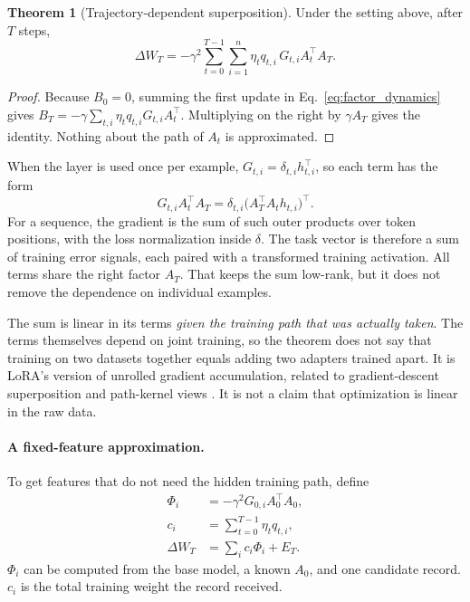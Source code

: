 \documentclass[11pt]{article}
\theoremstyle{plain}
\theoremstyle{definition}
\newtheorem{theorem}{Theorem}
\begin{document}
\begin{theorem}[Trajectory-dependent superposition]
\label{thm:exact_superposition}
Under the setting above, after $T$ steps,
\begin{equation}
\boxed{\displaystyle
\Delta W_T=-\gamma^2\sum_{t=0}^{T-1}\sum_{i=1}^n
\eta_tq_{t,i}\,G_{t,i}A_t^\top A_T.}
\label{eq:exact_superposition}
\end{equation}
\end{theorem}
\begin{proof}
Because $B_0=0$, summing the first update in Eq.~\eqref{eq:factor_dynamics} gives
$B_T=-\gamma\sum_{t,i}\eta_tq_{t,i}G_{t,i}A_t^\top$.
Multiplying on the right by $\gamma A_T$ gives the identity.
Nothing about the path of $A_t$ is approximated.
\end{proof}

When the layer is used once per example, $G_{t,i}=\delta_{t,i}h_{t,i}^\top$, so each term has the form
\begin{equation}
G_{t,i}A_t^\top A_T
=\delta_{t,i}\bigl(A_T^\top A_t h_{t,i}\bigr)^\top.
\label{eq:outer_product_atom}
\end{equation}
For a sequence, the gradient is the sum of such outer products over token positions, with the loss normalization inside $\delta$.
The task vector is therefore a sum of training error signals, each paired with a transformed training activation.
All terms share the right factor $A_T$. That keeps the sum low-rank, but it does not remove the dependence on individual examples.

The sum is linear in its terms \emph{given the training path that was actually taken}.
The terms themselves depend on joint training, so the theorem does not say that training on two datasets together equals adding two adapters trained apart.
It is LoRA's version of unrolled gradient accumulation, related to gradient-descent superposition and path-kernel views \citep{domingos2020every}.
It is not a claim that optimization is linear in the raw data.

\paragraph{A fixed-feature approximation.}
To get features that do not need the hidden training path, define
\begin{equation}
\begin{aligned}
\Phi_i&=-\gamma^2G_{0,i}A_0^\top A_0,\\
c_i&=\sum_{t=0}^{T-1}\eta_tq_{t,i},\\
\Delta W_T&=\sum_i c_i\Phi_i+E_T.
\end{aligned}
\label{eq:fixed_feature_model}
\end{equation}
$\Phi_i$ can be computed from the base model, a known $A_0$, and one candidate record. $c_i$ is the total training weight the record received.
\end{document}
